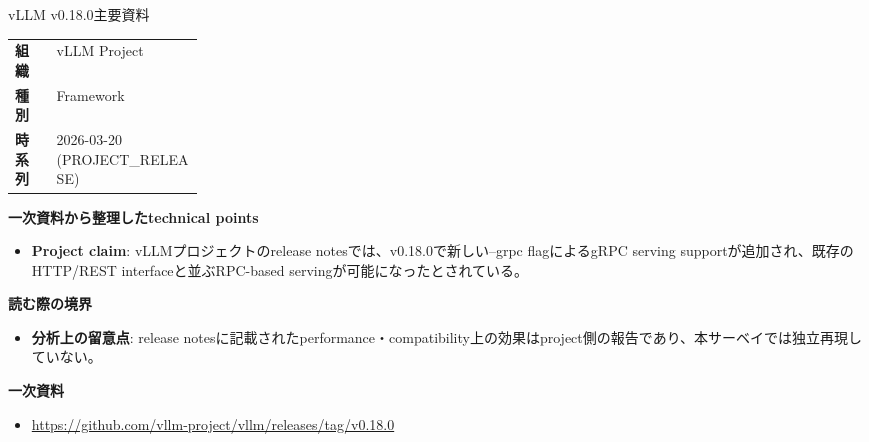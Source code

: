 \begin{technicalnote}{vLLM v0.18.0}{主要資料}
\begingroup
\begin{tabularx}{\linewidth}{@{}>{\bfseries}p{0.22\linewidth}X@{}}
組織 & vLLM Project \\
種別 & Framework \\
時系列 & 2026-03-20 (PROJECT\_RELEASE) \\
\end{tabularx}
\smallskip
{\bfseries 一次資料から整理したtechnical points}
\begin{itemize}[leftmargin=1.5em,itemsep=0.35em]
\item \textbf{Project claim}: vLLMプロジェクトのrelease notesでは、v0.18.0で新しい--grpc flagによるgRPC serving supportが追加され、既存のHTTP/REST interfaceと並ぶRPC-based servingが可能になったとされている。
\end{itemize}
\begin{minipage}{\linewidth}
{\bfseries 読む際の境界}
\begin{itemize}[leftmargin=1.5em,itemsep=0.35em]
\item \textbf{分析上の留意点}: release notesに記載されたperformance・compatibility上の効果はproject側の報告であり、本サーベイでは独立再現していない。
\end{itemize}
\begin{samepage}
{\bfseries 一次資料}
\begingroup\sloppy
\begin{itemize}[leftmargin=1.5em,itemsep=0.25em]
\item {\scriptsize\url{https://github.com/vllm-project/vllm/releases/tag/v0.18.0}}
\end{itemize}
\endgroup
\end{samepage}
\end{minipage}
\endgroup
\end{technicalnote}
\medskip

